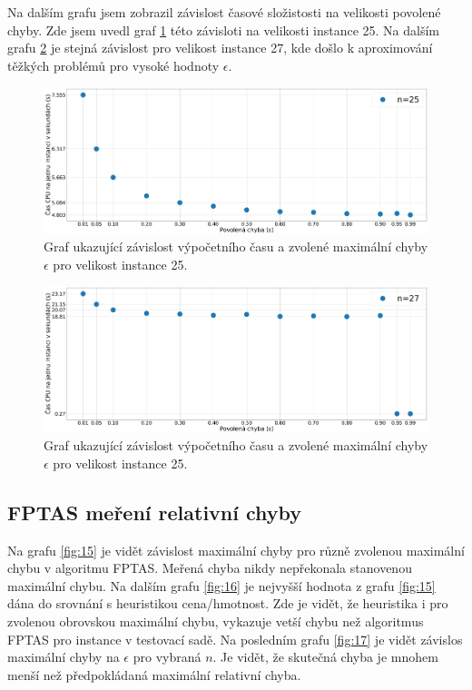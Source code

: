 \documentclass[11pt]{article}
\begin{document}
Na dalším grafu jsem zobrazil závislost časové složistosti na velikosti povolené chyby. Zde jsem uvedl graf \ref{fig:13} této závisloti na velikosti instance 25. Na dalším grafu \ref{fig:14} je stejná závislost pro velikost instance 27, kde došlo k aproximování těžkých problémů pro vysoké hodnoty $\epsilon$.
 
\begin{figure}[h]\centering
	\includegraphics[scale=0.2]{img/FPTASTimeEPS25}
 	\caption[2]{Graf ukazující závislost výpočetního času a zvolené maximální chyby $\epsilon$ pro velikost instance 25.}\label{fig:13}
 \end{figure} 	
 \begin{figure}[h]\centering
	\includegraphics[scale=0.2]{img/FPTASTimeEPS27}
 	\caption[2]{Graf ukazující závislost výpočetního času a zvolené maximální chyby $\epsilon$ pro velikost instance 25.}\label{fig:14}
 \end{figure} 	 
 
\subsection{FPTAS meření relativní chyby} 
 Na grafu \ref{fig:15} je vidět závislost maximální chyby pro různě zvolenou maximální chybu v algoritmu FPTAS. Meřená chyba nikdy nepřekonala stanovenou maximální chybu. Na dalším grafu \ref{fig:16} je nejvyšší hodnota z grafu \ref{fig:15} dána do srovnání s heuristikou cena/hmotnost. Zde je vidět, že heuristika i pro zvolenou obrovskou maximální chybu, vykazuje vetší chybu než algoritmus FPTAS pro instance v testovací sadě. Na posledním grafu \ref{fig:17} je vidět závislos maximální chyby na $\epsilon$ pro vybraná $n$. Je vidět, že skutečná chyba je mnohem menší než předpokládaná maximální relativní chyba.
 
\end{document}
